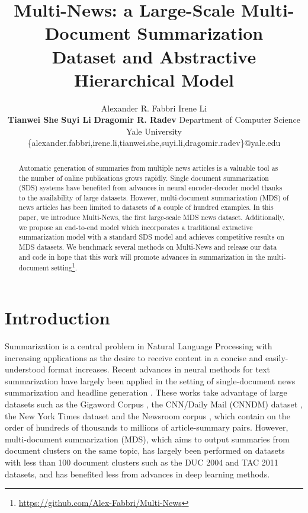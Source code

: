 \documentclass[11pt,a4paper]{article}
\title{Multi-News: a Large-Scale Multi-Document Summarization \\ Dataset and Abstractive Hierarchical Model}
\author{Alexander R. Fabbri \qquad Irene Li \vspace{0.005\textwidth}  \\  \qquad \textbf{Tianwei She} \qquad \textbf{Suyi Li}    \quad \hspace{0.01\textwidth} \textbf{Dragomir R. Radev}  \AND
  {\normalfont Department of Computer Science} \\
   {\normalfont Yale University} \\
{{ \normalfont \{alexander.fabbri,irene.li,tianwei.she,suyi.li,dragomir.radev}}\}@yale.edu \AND \vspace{-1.6cm}}
\date{}
\begin{document}
\maketitle
\begin{abstract}
Automatic generation of summaries from multiple news articles is a valuable tool as the number of online publications grows rapidly. Single document summarization (SDS) systems have benefited from advances in neural encoder-decoder model thanks to the availability of large datasets. However, multi-document summarization (MDS) of news articles has been limited to datasets of a couple of hundred examples. In this paper, we introduce Multi-News, the first large-scale MDS news dataset. Additionally, we propose an end-to-end model which incorporates a traditional extractive summarization model with a standard SDS model and achieves competitive results on MDS datasets. We benchmark several methods on Multi-News and release our data and code in hope that this work will promote advances in summarization in the multi-document setting\footnote{\url{https://github.com/Alex-Fabbri/Multi-News}}. 
\end{abstract}

\section{Introduction}


Summarization is a central problem in Natural Language Processing with increasing applications as the desire to receive content in a concise and easily-understood format increases. Recent advances in neural methods for text summarization have largely been applied in the setting of single-document news summarization and headline generation \cite{Rush:15, see2017ptr_gen, Gehrmann:18}.
These works take advantage of large datasets such as the Gigaword Corpus \cite{napoles12giga}, the CNN/Daily Mail (CNNDM) dataset \cite{Hermann:15}, the New York Times dataset \cite{NYT} and the Newsroom corpus \cite{Grusky:18}, which contain on the order of hundreds of thousands to millions of article-summary pairs. However, multi-document summarization (MDS), which aims to output summaries from document clusters on the same topic, has largely been performed on datasets with less than 100 document clusters such as the DUC 2004 \cite{paul2004introduction} and TAC 2011 \cite{owczarzak2011} datasets, and has benefited less from advances in deep learning methods. 
\end{document}

